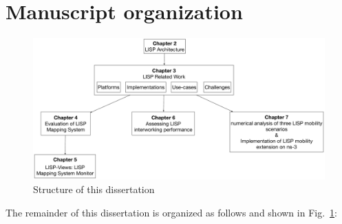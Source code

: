 \section{Manuscript organization}
\label{sec:intro_structure}
\begin{figure}[t]
	\centering
	\includegraphics[width=\textwidth]{Pics/structure_thesis.eps}
	\caption{Structure of this dissertation}
	\label{structure_thesis}
\end{figure}
The remainder of this dissertation is organized as follows and shown in Fig.~\ref{structure_thesis}:
